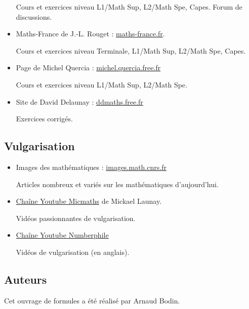 \begin{multicols}{2}
\begin{itemize}
	Cours et exercices niveau L1/Math Sup, L2/Math Spe, Capes.
	Forum de discussions.
	
	\item \og{}Maths-France\fg{} de J.-L. Rouget :
	\href{https://maths-france.fr/}{maths-france.fr}.
	
	Cours et exercices niveau Terminale, L1/Math Sup, L2/Math Spe, Capes.
	
	\item Page de Michel Quercia : 
	\href{http://michel.quercia.free.fr/}{michel.quercia.free.fr}
	
	Cours et exercices niveau L1/Math Sup, L2/Math Spe.
	
	\item Site de David Delaunay :
	\href{http://ddmaths.free.fr/index.html}{ddmaths.free.fr}
	
	Exercices corrigés.
	

\end{itemize}
	

\subsection*{Vulgarisation}

\begin{itemize}
	
	\item \og{}Images des mathématiques\fg{} :
	\href{https://images.math.cnrs.fr/}{images.math.cnrs.fr}
	
	Articles nombreux et variés sur les mathématiques d'aujourd'hui. 

    \item \href{https://www.youtube.com/channel/UC4PasDd25MXqlXBogBw9CAg}{Chaîne Youtube Micmaths} de Mickael Launay.
    
    Vidéos passionnantes de vulgarisation.
    
    \item \href{https://www.youtube.com/channel/UCoxcjq-8xIDTYp3uz647V5A}
    {Chaîne Youtube Numberphile}
    
    Vidéos de vulgarisation (en anglais).
\end{itemize}
    
    
\subsection*{Auteurs}

Cet ouvrage de formules a été réalisé par Arnaud Bodin.


\end{multicols}
